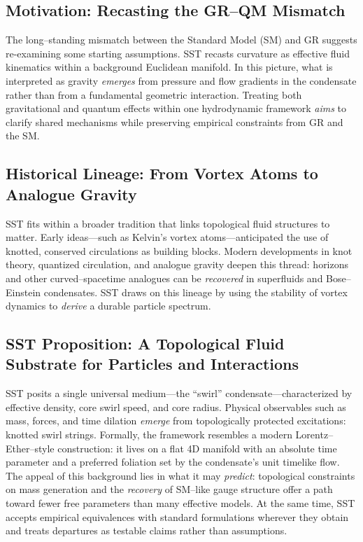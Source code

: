 \documentclass[10pt,reprint,aps,onecolumn,nofootinbib]{revtex4-2}
\begin{document}
    \subsection*{Motivation: Recasting the GR–QM Mismatch}
        The long–standing mismatch between the Standard Model (SM) and GR suggests re-examining some starting assumptions. SST recasts curvature as effective fluid kinematics within a background Euclidean manifold. In this picture, what is interpreted as gravity \emph{emerges} from pressure and flow gradients in the condensate rather than from a fundamental geometric interaction. Treating both gravitational and quantum effects within one hydrodynamic framework \emph{aims} to clarify shared mechanisms while preserving empirical constraints from GR and the SM.

    \subsection*{Historical Lineage: From Vortex Atoms to Analogue Gravity}
        SST fits within a broader tradition that links topological fluid structures to matter. Early ideas—such as Kelvin’s vortex atoms—anticipated the use of knotted, conserved circulations as building blocks. Modern developments in knot theory, quantized circulation, and analogue gravity deepen this thread: horizons and other curved–spacetime analogues can be \emph{recovered} in superfluids and Bose–Einstein condensates. SST draws on this lineage by using the stability of vortex dynamics to \emph{derive} a durable particle spectrum.

    \subsection*{SST Proposition: A Topological Fluid Substrate for Particles and Interactions}
        SST posits a single universal medium—the “swirl” condensate—characterized by effective density, core swirl speed, and core radius. Physical observables such as mass, forces, and time dilation \emph{emerge} from topologically protected excitations: knotted swirl strings. Formally, the framework resembles a modern Lorentz–Ether–style construction: it lives on a flat 4D manifold with an absolute time parameter and a preferred foliation set by the condensate’s unit timelike flow. The appeal of this background lies in what it may \emph{predict}: topological constraints on mass generation and the \emph{recovery} of SM–like gauge structure offer a path toward fewer free parameters than many effective models. At the same time, SST accepts empirical equivalences with standard formulations wherever they obtain and treats departures as testable claims rather than assumptions.
\end{document}
